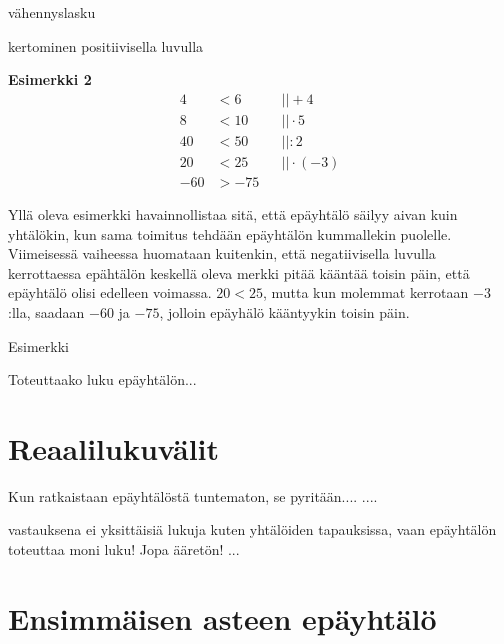 vähennyslasku

\begin{lukusuora}{-1}{10}{12}

\lukusuorauusi
\end{lukusuora}

kertominen positiivisella luvulla

\begin{lukusuora}{-1}{10}{12}

\lukusuorauusi
\end{lukusuora}

\textbf{Esimerkki 2}
\begin{align*}
4&<6  \ \ \ \ \ &&|| +4 \\
8&<10 &&|| \cdot 5 \\
40&<50 &&|| :2 \\
20&<25 &&|| \cdot (-3) \\
-60&>-75
\end{align*}

Yllä oleva esimerkki havainnollistaa sitä, että epäyhtälö säilyy aivan kuin
yhtälökin, kun sama toimitus tehdään epäyhtälön kummallekin puolelle.
Viimeisessä vaiheessa huomataan kuitenkin, että negatiivisella luvulla
kerrottaessa epähtälön keskellä oleva merkki pitää kääntää toisin päin, että
epäyhtälö olisi edelleen voimassa. $20<25$, mutta kun molemmat kerrotaan
$-3$:lla, saadaan $-60$ ja $-75$, jolloin epäyhälö kääntyykin toisin päin.

Esimerkki

Toteuttaako luku epäyhtälön...

\section{Reaalilukuvälit}

Kun ratkaistaan epäyhtälöstä tuntematon, se pyritään.... ....

vastauksena ei yksittäisiä lukuja kuten yhtälöiden tapauksissa, vaan epäyhtälön toteuttaa moni luku! Jopa ääretön! ...


\section{Ensimmäisen asteen epäyhtälö}


